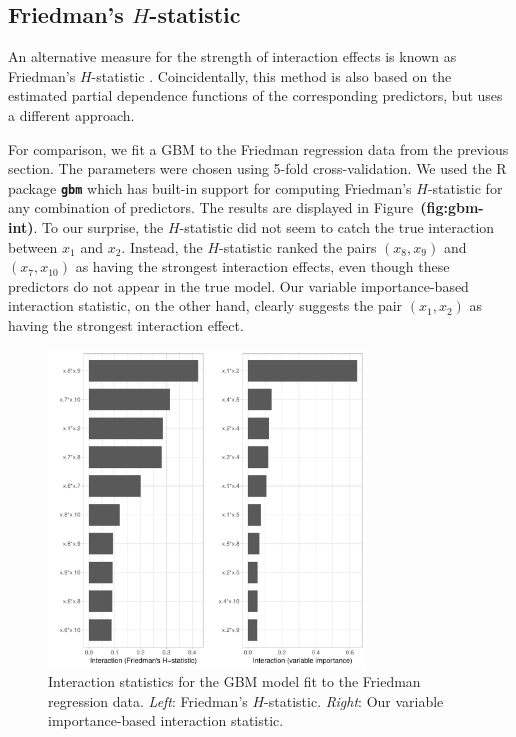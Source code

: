 \documentclass[12pt]{article}
\newcommand{\pkg}[1]{\texorpdfstring%
{{\normalfont\fontseries{b}\selectfont #1}}%
{#1}}
\def\pkg#1{\textbf{\texttt{#1}}}
\def\ref#1{\textbf{(#1)}}
\begin{document}
\subsection{Friedman's $H$-statistic}

An alternative measure for the strength of interaction effects is known as Friedman's $H$-statistic \citep{friedman-2008-predictive}. Coincidentally, this method is also based on the estimated partial dependence functions of the corresponding predictors, but uses a different approach.

For comparison, we fit a GBM to the Friedman regression data from the previous section. The parameters were chosen using 5-fold cross-validation. We used the R package \pkg{gbm} \citep{gbm-pkg} which has built-in support for computing Friedman's $H$-statistic for any combination of predictors. The results are displayed in Figure~\ref{fig:gbm-int}. To our surprise, the $H$-statistic did not seem to catch the true interaction between $x_1$ and $x_2$. Instead, the $H$-statistic ranked the pairs $\left(x_8, x_9\right)$ and $\left(x_7, x_{10}\right)$ as having the strongest interaction effects, even though these predictors do not appear in the true model. Our variable importance-based interaction statistic, on the other hand, clearly suggests the pair $\left(x_1, x_2\right)$ as having the strongest interaction effect.

\begin{figure}[!htb]
  \centering
  \includegraphics[width=0.75\textwidth]{gbm-int}
  \caption{Interaction statistics for the GBM model fit to the Friedman regression data. \textit{Left}: Friedman's $H$-statistic. \textit{Right}: Our variable importance-based interaction statistic. \label{fig:gbm-int}}
\end{figure}
\end{document}
